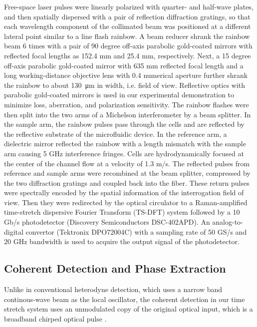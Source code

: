 \documentclass[aps,pra,reprint,superscriptaddress]{revtex4-1}
\begin{document}
Free-space laser pulses were linearly polarized with quarter- and half-wave plates, and then spatially dispersed with a pair of reflection diffraction gratings, so that each wavelength component of the collimated beam was positioned at a different lateral point similar to a line flash rainbow. A beam reducer shrank the rainbow beam 6 times with a pair of 90 degree off-axis parabolic gold-coated mirrors with reflected focal lengths as 152.4 mm and 25.4 mm, respectively. Next, a 15 degree off-axis parabolic gold-coated mirror with 635 mm reflected focal length and a long working-distance objective lens with 0.4 numerical aperture further shrank the rainbow to about \SI{130}{\micro\meter} in width, i.e. field of view. Reflective optics with parabolic gold-coated mirrors is used in our experimental demonstration to minimize loss, aberration, and polarization sensitivity. The rainbow flashes were then split into the two arms of a Michelson interferometer by a beam splitter. In the sample arm, the rainbow pulses pass through the cells and are reflected by the reflective substrate of the microfluidic device. In the reference arm, a dielectric mirror reflected the rainbow with a length mismatch with the sample arm causing 5 GHz interference fringes. Cells are hydrodynamically focused at the center of the channel flow at a velocity of 1.3 m/s. The reflected pulses from reference and sample arms were recombined at the beam splitter, compressed by the two diffraction gratings and coupled back into the fiber. These return pulses were spectrally encoded by the spatial information of the interrogation field of view. Then they were redirected by the optical circulator to a Raman-amplified time-stretch dispersive Fourier Transform (TS-DFT) system followed by a 10 Gb/s photodetector (Discovery Semiconductors DSC-402APD). An analog-to-digital convertor (Tektronix DPO72004C) with a sampling rate of 50 GS/s and 20 GHz bandwidth is used to acquire the output signal of the photodetector.

\subsection{Coherent Detection and Phase Extraction}

Unlike in conventional heterodyne detection, which uses a narrow band continous-wave beam as the local oscillator, the coherent detection in our time stretch system uses an unmodulated copy of the original optical input, which is a broadband chirped optical pulse \cite{buckley2013coherent, devore2014coherent}. 
\end{document}
